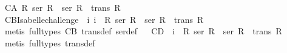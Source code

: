 \begin{isabellebody}
\begin{isamarkuptext}
\begin{isbfig}{7em}
\end{isbfig}%
\end{isamarkuptext}%
\isamarkuptrue%
%
\isamarkuptrue%
\isamarkupfalse%
\ C{}{}{\isacharunderscore}A{\isacharcolon}\ {\isachardoublequoteopen}{\isasymforall}R{\isachardot}\ {\isacharparenleft}ser\ R{\isacharparenright}\ {\isasymlongrightarrow}\ {\isacharparenleft}ser\ R{\isacharparenright}\ {\isasymand}\ {\isacharparenleft}trans\ R{\isacharparenright}{\isachardoublequoteclose}\ \isanewline
\ \isamarkupfalse%
%
\isadelimproof
\ %
\endisadelimproof
%
\isatagproof
{}\isamarkupfalse%
%
\endisatagproof
{\isafoldproof}%
%
\isadelimproof
%
\endisadelimproof
\isanewline
{}\isamarkupfalse%
\ C{}{}{\isacharunderscore}B{\isacharunderscore}Isabelle{\isacharunderscore}challenge{\isacharcolon}\ {\isachardoublequoteopen}{\isacharhash}\ i{}\ i{}\ {\isasymlongrightarrow}\ {\isasymnot}{\isacharparenleft}{\isasymforall}R{\isachardot}\ ser\ R\ {\isasymlongrightarrow}\ {\isacharparenleft}ser\ R\ {\isasymand}\ trans\ R{\isacharparenright}{\isacharparenright}{\isachardoublequoteclose}\isanewline
%
\isanewline
%
\isanewline
%
\isadelimproof
\ %
\endisadelimproof
%
\isatagproof
{}\isamarkupfalse%
\ {\isacharparenleft}metis\ {\isacharparenleft}full{\isacharunderscore}types{\isacharparenright}\ C{}{\isacharunderscore}B\ trans{\isacharunderscore}def\ ser{\isacharunderscore}def{\isacharparenright}%
\endisatagproof
{\isafoldproof}%
%
\isadelimproof
%
\endisadelimproof
\ \isanewline
{}\isamarkupfalse%
\ C{}{}{\isacharunderscore}D{\isacharcolon}\ {\isachardoublequoteopen}{\isacharhash}\ i{}\ {\isasymlongrightarrow}\ {\isacharparenleft}{\isasymforall}R{\isachardot}\ ser\ R\ {\isasymlongrightarrow}\ {\isacharparenleft}ser\ R\ {\isasymand}\ trans\ R{\isacharparenright}{\isacharparenright}{\isachardoublequoteclose}%
\isadelimproof
\ %
\endisadelimproof
%
\isatagproof
{}\isamarkupfalse%
\ {\isacharparenleft}metis\ {\isacharparenleft}full{\isacharunderscore}types{\isacharparenright}\ trans{\isacharunderscore}def{\isacharparenright}%
\endisatagproof
{\isafoldproof}%
%
\isadelimproof
%
\endisadelimproof

\end{isabellebody}
